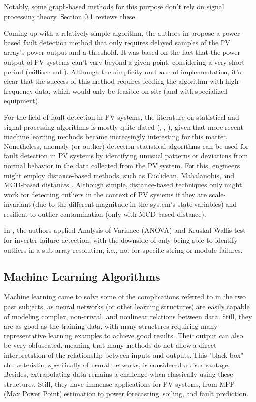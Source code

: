 Notably, some graph-based methods for this purpose don't rely on signal processing theory. Section \ref{subsec:machinelearning} reviews these.

Coming up with a relatively simple algorithm, the authors in \cite{Iles2021} propose a power-based fault detection method that only requires delayed samples of the PV array's power output and a threshold. It was based on the fact that the power output of PV systems can't vary beyond a given point, considering a very short period (milliseconds). Although the simplicity and ease of implementation, it's clear that the success of this method requires feeding the algorithm with high-frequency data, which would only be feasible on-site (and with specialized equipment).

For the field of fault detection in PV systems, the literature on statistical and signal processing algorithms is mostly quite dated (\cite{Buddha2012}, \cite{Zhao2014}, \cite{Vergura2008}), given that more recent machine learning methods became increasingly interesting for this matter. Nonetheless, anomaly (or outlier) detection statistical algorithms can be used for fault detection in PV systems by identifying unusual patterns or deviations from normal behavior in the data collected from the PV system. For this, engineers might employ distance-based methods, such as Euclidean, Mahalanobis, and MCD-based distances \cite{Braun2011}. Although simple, distance-based techniques only might work for detecting outliers in the context of PV systems if they are scale-invariant (due to the different magnitude in the system's state variables) and resilient to outlier contamination (only with MCD-based distance).

In  \cite{Vergura2008}, the authors applied Analysis of Variance (ANOVA) and Kruskal-Wallis test for inverter failure detection, with the downside of only being able to identify outliers in a sub-array resolution, i.e., not for specific string or module failures.




\subsection{Machine Learning Algorithms} \label{subsec:machinelearning}

Machine learning came to solve some of the complications referred to in the two past subjects, as neural networks (or other learning structures) are easily capable of modeling complex, non-trivial, and nonlinear relations between data. Still, they are as good as the training data, with many structures requiring many representative learning examples to achieve good results. Their output can also be very obfuscated, meaning that many methods do not allow a direct interpretation of the relationship between inputs and outputs. This "black-box" characteristic, specifically of neural networks, is considered a disadvantage. Besides, extrapolating data remains a challenge when classically using these structures. Still, they have immense applications for PV systems, from MPP (Max Power Point) estimation to power forecasting, soiling, and fault prediction.

